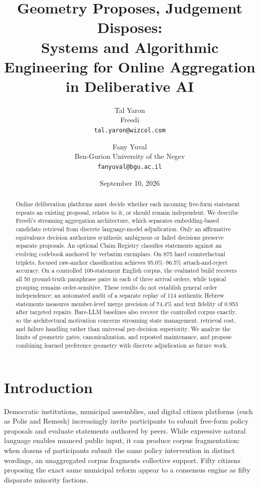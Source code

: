 \documentclass[11pt,a4paper]{article}
\title{\bfseries Geometry Proposes, Judgement Disposes:\\Systems and Algorithmic Engineering for Online Aggregation in Deliberative AI}
\author{Tal Yaron\\Freedi\\\texttt{tal.yaron@wizcol.com}
\and Fany Yuval\\Ben-Gurion University of the Negev\\\texttt{fanyuval@bgu.ac.il}}
\date{September 10, 2026}
\begin{document}
\maketitle
\begin{abstract}
Online deliberation platforms must decide whether each incoming free-form statement repeats an existing proposal, relates to it, or should remain independent. We describe Freedi's streaming aggregation architecture, which separates embedding-based candidate retrieval from discrete language-model adjudication. Only an affirmative equivalence decision authorizes synthesis; ambiguous or failed decisions preserve separate proposals. An optional Claim Registry classifies statements against an evolving codebook anchored by verbatim exemplars. On 875 hard counterfactual triplets, focused raw-anchor classification achieves 95.0\%--96.5\% attach-and-reject accuracy. On a controlled 100-statement English corpus, the evaluated build recovers all 50 ground-truth paraphrase pairs in each of three arrival orders, while topical grouping remains order-sensitive. These results do not establish general order independence: an automated audit of a separate replay of 114 authentic Hebrew statements measures member-level merge precision of 74.4\% and text fidelity of 0.953 after targeted repairs. Bare-LLM baselines also recover the controlled corpus exactly, so the architectural motivation concerns streaming state management, retrieval cost, and failure handling rather than universal per-decision superiority. We analyze the limits of geometric gates, canonicalization, and repeated maintenance, and propose combining learned preference geometry with discrete adjudication as future work.
\end{abstract}

\section{Introduction}

Democratic institutions, municipal assemblies, and digital citizen platforms (such as Polis and Remesh) increasingly invite participants to submit free-form policy proposals and evaluate statements authored by peers. While expressive natural language enables nuanced public input, it can produce corpus fragmentation: when dozens of participants submit the same policy intervention in distinct wordings, an unaggregated corpus fragments collective support. Fifty citizens proposing the exact same municipal reform appear to a consensus engine as fifty disparate minority factions.
\end{document}
